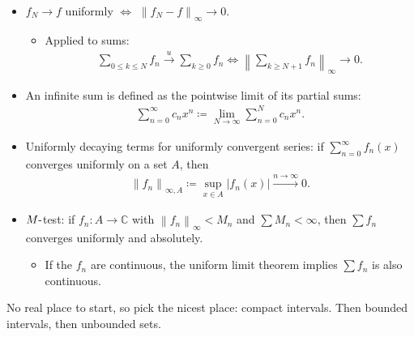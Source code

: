 \begin{concept}

\envlist

\begin{itemize}
\tightlist
\item
  \(f_N\to f\) uniformly \(\iff\)
  \({\left\lVert {f_N - f} \right\rVert}_\infty \to 0\).

  \begin{itemize}
  \tightlist
  \item
    Applied to sums:
    \begin{align*}
    \sum_{0 \leq k\leq N} f_n \overset{u}\to \sum_{k\geq 0} f_n \iff {\left\lVert {\sum_{k\geq N+1} f_n } \right\rVert}_{\infty} \to 0
    .\end{align*}
  \end{itemize}
\item
  An infinite sum is defined as the pointwise limit of its partial sums:
  \begin{align*}
  \sum_{n=0}^\infty c_n x^n \coloneqq\lim_{N\to \infty} \sum_{n=0}^N c_n x^n
   .\end{align*}
\item
  Uniformly decaying terms for uniformly convergent series: if
  \(\sum_{n=0}^\infty f_n(x)\) converges uniformly on a set \(A\), then
  \begin{align*}
  {\left\lVert {f_n} \right\rVert}_{\infty, A} \coloneqq\sup_{x\in A} {\left\lvert {f_n(x)} \right\rvert} \overset{n\to\infty}\longrightarrow 0
  .\end{align*}
\item
  \(M{\hbox{-}}\)test: if \(f_n:A \to{\mathbb{C}}\) with
  \({\left\lVert {f_n} \right\rVert}_\infty < M_n\) and
  \(\sum M_n < \infty\), then \(\sum f_n\) converges uniformly and
  absolutely.

  \begin{itemize}
  \tightlist
  \item
    If the \(f_n\) are continuous, the uniform limit theorem implies
    \(\sum f_n\) is also continuous.
  \end{itemize}
\end{itemize}

\end{concept}

\begin{strategy}

No real place to start, so pick the nicest place: compact intervals.
Then bounded intervals, then unbounded sets.

\end{strategy}

